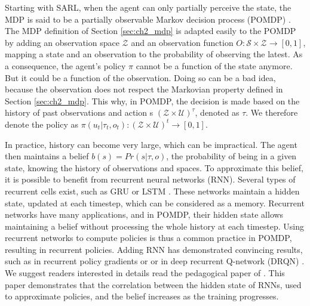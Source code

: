 Starting with SARL, when the agent can only partially perceive the state, the MDP is said to be a partially observable Markov decision process (POMDP) \citep{KAELBLING199899}. 
The MDP definition of Section \ref{sec:ch2_mdp} is adapted easily to the POMDP by adding an observation space $\mathcal{Z}$ and an observation function $O:\mathcal{S} \times \mathcal{Z} \rightarrow [0, 1]$, mapping a state and an observation to the probability of observing the latest.
As a consequence, the agent's policy $\pi$ cannot be a function of the state anymore.
But it could be a function of the observation.
Doing so can be a bad idea, because the observation does not respect the Markovian property defined in Section \ref{sec:ch2_mdp}.
This why, in POMDP, the decision is made based on the history of past observations and action s $(\mathcal{Z} \times \mathcal{U})^\tau$, denoted as $\tau$.
We therefore denote the policy as $\pi(u_t|\tau_t,o_t): (\mathcal{Z} \times \mathcal{U})^t \rightarrow [0,1]$.

In practice, history can become very large, which can be impractical.
The agent then maintains a belief $b(s)=Pr(s|\tau,o)$, the probability of being in a given state, knowing the history of observations and spaces.
To approximate this belief, it is possible to benefit from recurrent neural networks (RNN).
Several types of recurrent cells exist, such as GRU \citep{Chung2014EmpiricalModeling} or LSTM \citep{Hochreiter1997LongMemory}.
These networks maintain a hidden state, updated at each timestep, which can be considered as a memory.
Recurrent networks have many applications, and in POMDP, their hidden state allows maintaining a belief without processing the whole history at each timestep.
Using recurrent networks to compute policies is thus a common practice in POMDP, resulting in recurrent policies.
Adding RNN has demonstrated convincing results, such as in recurrent policy gradients or \citep{wierstra2010recurrent} or in deep recurrent Q-network (DRQN) \citep{Hausknecht2015DeepMDPs}.
We suggest readers interested in details read the pedagogical paper of \cite{lambrechts2022recurrent}.
This paper demonstrates that the correlation between the hidden state of RNNs, used to approximate policies, and the belief increases as the training progresses.

